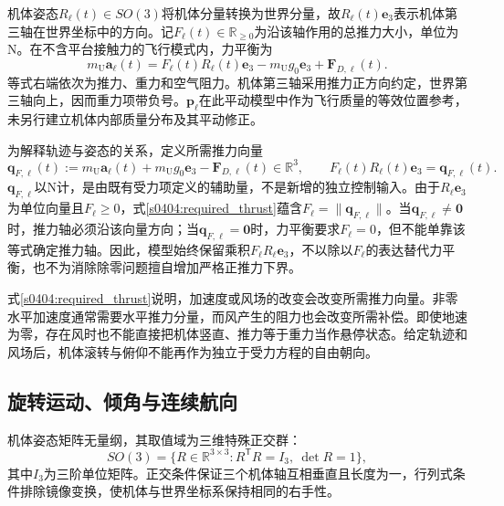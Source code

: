 机体姿态$R_\ell(t)\in SO(3)$将机体分量转换为世界分量，故$R_\ell(t)\mathbf e_3$表示机体第三轴在世界坐标中的方向。记$F_\ell(t)\in\mathbb R_{\ge0}$为沿该轴作用的总推力大小，单位为$\mathrm N$。在不含平台接触力的飞行模式内，力平衡为
\begin{equation}
 m_{\mathrm U}\mathbf a_\ell(t)
 =F_\ell(t)R_\ell(t)\mathbf e_3
 -m_{\mathrm U}g_0\mathbf e_3
 +\mathbf F_{D,\ell}(t).
 \label{s0404:force_balance}
\end{equation}
等式右端依次为推力、重力和空气阻力。机体第三轴采用推力正方向约定，世界第三轴向上，因而重力项带负号。$\mathbf p_\ell$在此平动模型中作为飞行质量的等效位置参考，未另行建立机体内部质量分布及其平动修正。

为解释轨迹与姿态的关系，定义所需推力向量
\begin{equation}
 \mathbf q_{F,\ell}(t)
 :=m_{\mathrm U}\mathbf a_\ell(t)
   +m_{\mathrm U}g_0\mathbf e_3
   -\mathbf F_{D,\ell}(t)\in\mathbb R^3,
 \qquad
 F_\ell(t)R_\ell(t)\mathbf e_3=\mathbf q_{F,\ell}(t).
 \label{s0404:required_thrust}
\end{equation}
$\mathbf q_{F,\ell}$以$\mathrm N$计，是由既有受力项定义的辅助量，不是新增的独立控制输入。由于$R_\ell\mathbf e_3$为单位向量且$F_\ell\ge0$，式\eqref{s0404:required_thrust}蕴含$F_\ell=\|\mathbf q_{F,\ell}\|$。当$\mathbf q_{F,\ell}\ne\mathbf0$时，推力轴必须沿该向量方向；当$\mathbf q_{F,\ell}=\mathbf0$时，力平衡要求$F_\ell=0$，但不能单靠该等式确定推力轴。因此，模型始终保留乘积$F_\ell R_\ell\mathbf e_3$，不以除以$F_\ell$的表达替代力平衡，也不为消除除零问题擅自增加严格正推力下界。

式\eqref{s0404:required_thrust}说明，加速度或风场的改变会改变所需推力向量。非零水平加速度通常需要水平推力分量，而风产生的阻力也会改变所需补偿。即使地速为零，存在风时也不能直接把机体竖直、推力等于重力当作悬停状态。给定轨迹和风场后，机体滚转与俯仰不能再作为独立于受力方程的自由朝向。

\subsection{旋转运动、倾角与连续航向}

机体姿态矩阵无量纲，其取值域为三维特殊正交群：
\begin{equation}
 SO(3)=\{R\in\mathbb R^{3\times3}:
 R^{\mathsf T}R=I_3,\ \det R=1\},
 \label{s0404:so3}
\end{equation}
其中$I_3$为三阶单位矩阵。正交条件保证三个机体轴互相垂直且长度为一，行列式条件排除镜像变换，使机体与世界坐标系保持相同的右手性。

